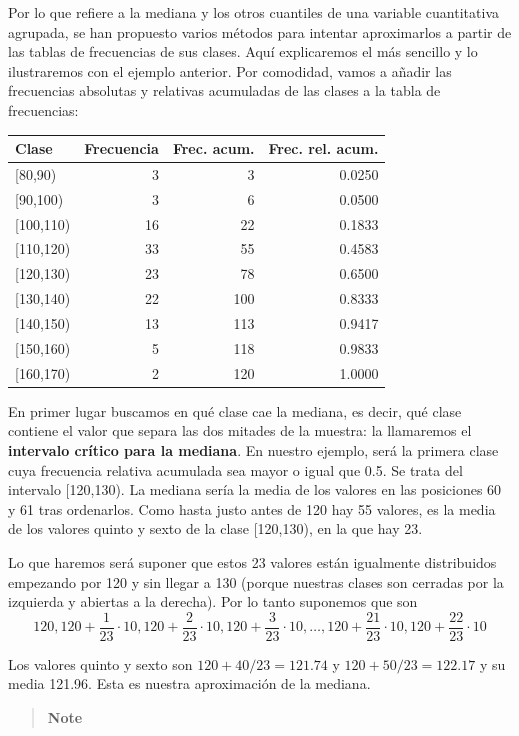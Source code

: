 \documentclass[
  spanish,
  letterpaper,
  DIV=11,
  numbers=noendperiod]{scrreprt}
\begin{document}
\begin{tcolorbox}
Por lo que refiere a la mediana y los otros cuantiles de una variable
cuantitativa agrupada, se han propuesto varios métodos para intentar
aproximarlos a partir de las tablas de frecuencias de sus clases. Aquí
explicaremos el más sencillo y lo ilustraremos con el ejemplo anterior.
Por comodidad, vamos a añadir las frecuencias absolutas y relativas
acumuladas de las clases a la tabla de frecuencias:

\begin{longtable*}[t]{lrrr}
\toprule
Clase & Frecuencia & Frec. acum. & Frec. rel. acum.\\
\midrule
{}[80,90) & 3 & 3 & 0.0250\\
{}[90,100) & 3 & 6 & 0.0500\\
{}[100,110) & 16 & 22 & 0.1833\\
{}[110,120) & 33 & 55 & 0.4583\\
{}[120,130) & 23 & 78 & 0.6500\\
\addlinespace
{}[130,140) & 22 & 100 & 0.8333\\
{}[140,150) & 13 & 113 & 0.9417\\
{}[150,160) & 5 & 118 & 0.9833\\
{}[160,170) & 2 & 120 & 1.0000\\
\bottomrule
\end{longtable*}

En primer lugar buscamos en qué clase cae la mediana, es decir, qué
clase contiene el valor que separa las dos mitades de la muestra: la
llamaremos el \textbf{intervalo crítico para la mediana}. En nuestro
ejemplo, será la primera clase cuya frecuencia relativa acumulada sea
mayor o igual que 0.5. Se trata del intervalo {[}120,130). La mediana
sería la media de los valores en las posiciones 60 y 61 tras ordenarlos.
Como hasta justo antes de 120 hay 55 valores, es la media de los valores
quinto y sexto de la clase {[}120,130), en la que hay 23.

Lo que haremos será suponer que estos 23 valores están igualmente
distribuidos empezando por 120 y sin llegar a 130 (porque nuestras
clases son cerradas por la izquierda y abiertas a la derecha). Por lo
tanto suponemos que son \[
120, 120+\frac{1}{23}\cdot 10, 120+\frac{2}{23}\cdot 10, 120+\frac{3}{23}\cdot 10,\ldots, 120+\frac{21}{23}\cdot 10, 120+\frac{22}{23}\cdot 10
\]

Los valores quinto y sexto son \(120+40/23=121.74\) y
\(120+50/23=122.17\) y su media 121.96. Esta es nuestra aproximación de
la mediana.

\begin{quote}
\textbf{Note}


\end{quote}
\end{tcolorbox}
\end{document}
